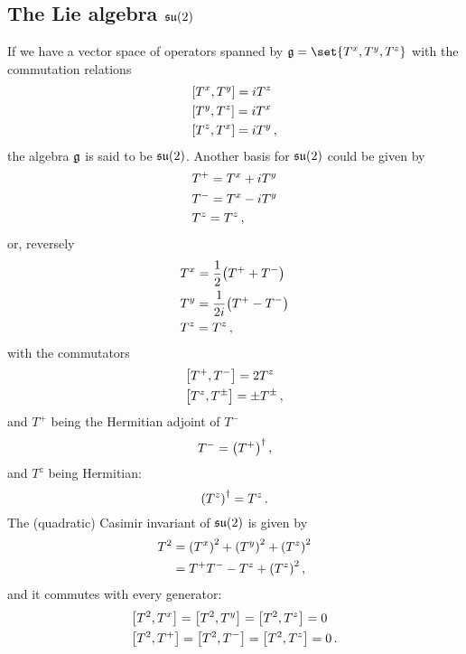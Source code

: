     \subsection{The Lie algebra $\operatorname{\mathfrak{su}}(2)$}
        If we have a vector space of operators spanned by $\glie = \set{T^x, T^y, T^z}$ with the commutation relations
        \begin{align}
            & \comm{T^x}{T^y} = i T^z \\
            & \comm{T^y}{T^z} = i T^x \\
            & \comm{T^z}{T^x} = i T^y \thinspace ,
        \end{align}
        the algebra $\operatorname{\mathfrak{g}}$ is said to be $\operatorname{\mathfrak{su}}(2)$. Another basis for $\operatorname{\mathfrak{su}}(2)$ could be given by
        \begin{align}
            & T^+ = T^x + i T^y \\
            & T^- = T^x - i T^y \\
            & T^z = T^z \thinspace ,
        \end{align}
        or, reversely
        \begin{align}
            & T^x = \frac{1}{2} \qty(T^+ + T^-) \\
            & T^y = \frac{1}{2i} \qty(T^+ - T^-) \\
            & T^z = T^z \thinspace ,
        \end{align}
        with the commutators
        \begin{align}
            & \comm{T^+}{T^-} = 2 T^z \\
            & \comm{T^z}{T^\pm} = \pm T^\pm \thinspace ,
        \end{align}
        and $T^+$ being the Hermitian adjoint of $T^-$
        \begin{equation}
            T^- = \qty(T^+)^\dagger \thinspace ,
        \end{equation}
        and $T^z$ being Hermitian:
        \begin{equation}
            \qty(T^z)^\dagger = T^z \thinspace .
        \end{equation}
        The (quadratic) Casimir invariant of $\operatorname{\mathfrak{su}}(2)$ is given by
        \begin{align}
            T^2 &= \qty(T^x)^2 + \qty(T^y)^2 + \qty(T^z)^2 \\
            &= T^+ T^- - T^z + \qty(T^z)^2 \thinspace ,
        \end{align}
        and it commutes with every generator:
        \begin{align}
            & \comm{T^2}{T^x} = \comm{T^2}{T^y} = \comm{T^2}{T^z} = 0 \\
            & \comm{T^2}{T^+} = \comm{T^2}{T^-} = \comm{T^2}{T^z} = 0 \thinspace .
        \end{align}

